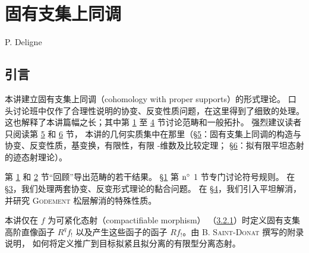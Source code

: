 \chapter{固有支集上同调}\label{sga4.exp.XVII}
\begin{center}
P. Deligne
\end{center}

\renewcommand{\sisi}[2]{#2}

\setcounter{pageoriginal}{251}



\section*{引言}\pageoriginale

本讲建立固有支集上同调（cohomology with proper supports）的形式理论。
口头讨论班中仅作了合理性说明的协变、反变性质问题，在这里得到了细致的处理。
这也解释了本讲篇幅之长；其中第 \hyperref[XVII.sec1]{1} 至
\hyperref[XVII.sec4]{4} 节讨论范畴和一般拓扑。
强烈建议读者只阅读第 \hyperref[XVII.sec5]{5} 和 \hyperref[XVII.sec6]{6} 节，
本讲的几何实质集中在那里（\S \hyperref[XVII.sec5]{5}：固有支集上同调的构造与
协变、反变性质，基变换，有限性，有限 \tTor-维数及比较定理；
\S \hyperref[XVII.sec6]{6}：拟有限平坦态射的\sisi{迹}{迹}态射理论）。

第 \hyperref[XVII.sec1]{1} 和 \hyperref[XVII.sec2]{2} 节“回顾”导出范畴的若干结果。
\S \hyperref[XVII.sec1]{1} 第 ${\rm n^{\circ}}$ 1 节专门讨论符号规则。
在 \S \hyperref[XVII.sec3]{3}，我们处理两套协变、反变形式理论的黏合问题。
在 \S \hyperref[XVII.sec4]{4}，我们引入平坦解消，并研究 \textsc{Godement}
松层解消的特殊性质。

本讲\pageoriginale 仅在 $f$ 为可紧化态射（compactifiable morphism）
（\hyperref[XVII.def3.2.1]{3.2.1}）时定义固有支集高阶直像函子 $R^{q}f_{!}$
以及产生这些函子的函子 $Rf_{!}$。由 \textsc{B. Saint-Donat} 撰写的附录说明，
如何将定义推广到目标拟紧且拟分离的有限型分离态射。

